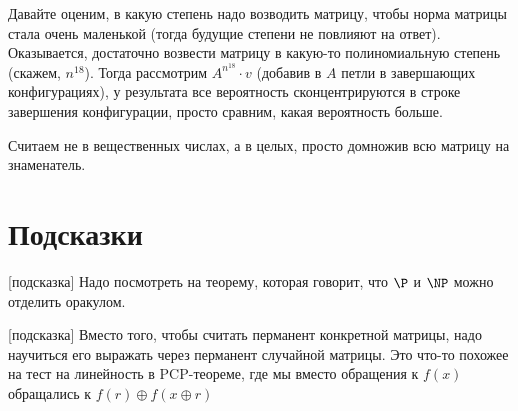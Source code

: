 	Давайте оценим, в какую степень надо возводить матрицу, чтобы норма матрицы стала очень маленькой
	(тогда будущие степени не повлияют на ответ).
	Оказывается, достаточно возвести матрицу в какую-то полиномиальную степень (скажем, $n^{18}$).
	Тогда рассмотрим $A^{n^{18}} \cdot v$ (добавив в $A$ петли в завершающих конфигурациях),
	у результата все вероятность сконцентрируются в строке завершения конфигурации, просто сравним, какая вероятность больше.

	Считаем не в вещественных числах, а в целых, просто домножив всю матрицу на знаменатель.

\section{Подсказки}
[подсказка]
	Надо посмотреть на теорему, которая говорит, что $\P$ и $\NP$ можно отделить оракулом.

[подсказка]
	Вместо того, чтобы считать перманент конкретной матрицы, надо научиться его выражать через перманент случайной матрицы.
	Это что-то похожее на тест на линейность в PCP-теореме, где мы вместо обращения к $f(x)$ обращались к $f(r) \oplus f(x \oplus r)$
